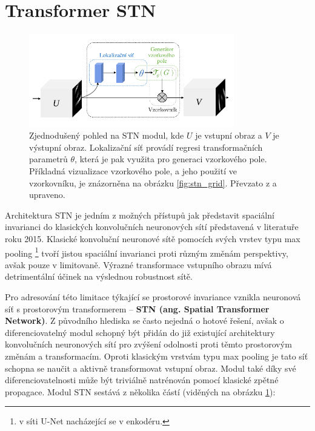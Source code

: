 \section{Transformer STN}
\label{sec:Chapter28}

\begin{figure}[ht]
\centering
\includegraphics[width=0.8\textwidth,keepaspectratio]{Figures/stn/stn_module.pdf}
\caption[Zjednodušený pohled na STN modul]
{Zjednodušený pohled na STN modul, kde $U$ je vstupní obraz a $V$ je výstupní obraz. Lokalizační síť provádí regresi transformačních parametrů $\theta$, která je pak využita pro generaci vzorkového pole. Příkladná vizualizace vzorkového pole, a jeho použití ve vzorkovníku, je znázorněna na obrázku \ref{fig:stn_grid}. Převzato z \cite{stn} a upraveno. }
\label{fig:stn_overview}
\end{figure}

Architektura STN je jedním z možných přístupů jak představit spaciální invarianci do klasických konvolučních neuronových sítí představená v literatuře \cite{stn} roku 2015. Klasické konvoluční neuronové sítě pomocích svých vrstev typu max pooling \footnote{v síti U-Net nacházející se v enkodéru.} tvoří jistou spaciální invarianci proti různým změnám perspektivy, avšak pouze v limitovaně. Výrazné transformace vstupního obrazu mívá detrimentální účinek na výslednou robustnost sítě.

Pro adresování této limitace týkající se prostorové invariance vznikla neuronová síť s prostorovým transformerem -- \textbf{STN (ang. Spatial Transformer Network)}. Z původního hlediska se často nejedná o hotové řešení, avšak o diferenciovatelný modul schopný být přidán do již existující architektury konvolučních neuronových sítí pro zvýšení odolnosti proti těmto prostorovým změnám a transformacím. Oproti klasickým vrstvám typu max pooling je tato síť schopna se naučit a aktivně transformovat vstupní obraz. Modul také díky své diferenciovatelnosti může být triviálně natrénován pomocí klasické zpětné propagace. Modul STN sestává z několika částí (viděných na obrázku \ref{fig:stn_overview}):

